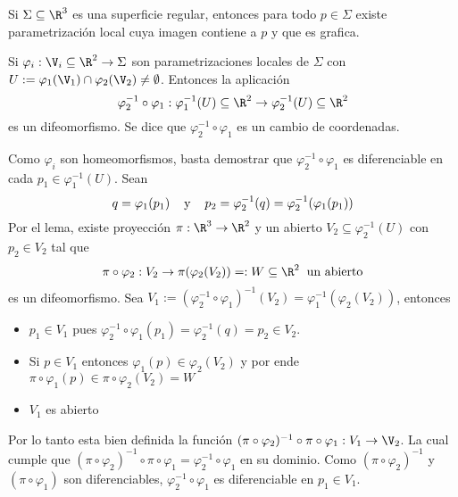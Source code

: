 \documentclass{article}
\begin{document}
\begin{cor}
    Si $\Sigma\subseteq\R^{3}$ es una superficie regular, entonces para todo $p\in\Sigma$ existe 
    parametrización local cuya imagen contiene a $p$ y que es grafica.
\end{cor}

\begin{teo}
    Si $\varphi_{i}:\V_{i}\subseteq\R^{2}\to\Sigma$ son parametrizaciones locales de $\Sigma$ con
    $U:=\varphi_{1}(\V_{1})\cap \varphi_{2}(\V_{2})\neq\emptyset$. Entonces la aplicación
    \begin{equation*}
        \varphi_{2}^{-1}\circ \varphi_{1}:\varphi_{1}^{-1}(U)\subseteq\R^{2}\to 
        \varphi_{2}^{-1}(U)\subseteq\R^{2}
    \end{equation*}
    es un difeomorfismo. Se dice que $\varphi_{2}^{-1}\circ \varphi_{1}$ es un cambio de 
    coordenadas.
\end{teo}

\begin{dem}
    Como $\varphi_{i}$ son homeomorfismos, basta demostrar que $\varphi_{2}^{-1}\circ \varphi_{1}$ 
    es diferenciable en cada $p_{1}\in \varphi_{1}^{-1}(U)$. Sean
    \begin{equation*}
        q=\varphi_{1}(p_{1})\hspace{4mm}\text{y}\hspace{4mm}p_{2}=\varphi_{2}^{-1}(q)=\varphi_{2}^{-1}(\varphi_{1}(p_{1}))
    \end{equation*}
    Por el lema, existe proyección $\pi:\R^{3}\to\R^{2}$ y un abierto $V_{2}\subseteq 
    \varphi_{2}^{-1}(U)$ con $p_{2}\in V_{2}$ tal que
    \begin{equation*}
        \pi\circ \varphi_{2}:V_{2}\to\pi(\varphi_{2}(V_{2}))=:W\subseteq\R^{2}\hspace{2mm}
        \text{un abierto}
    \end{equation*}
    es un difeomorfismo. Sea $V_{1}:=(\varphi_{2}^{-1}\circ \varphi_{1})^{-1}(V_{2})=
    \varphi_{1}^{-1}(\varphi_{2}(V_{2}))$, entonces
    \begin{itemize}
        \item $p_{1}\in V_{1}$ pues $\varphi_{2}^{-1}\circ \varphi_{1}(p_{1})=\varphi_{2}^{-1}(q)
        =p_{2}\in V_{2}$.
        
        \item Si $p\in V_{1}$ entonces $\varphi_{1}(p)\in\varphi_{2}(V_{2})$ y por ende
        $\pi\circ\varphi_{1}(p)\in\pi\circ\varphi_{2}(V_{2})=W$
        
        \item $V_{1}$ es abierto
    \end{itemize}
    Por lo tanto esta bien definida la función $(\pi\circ\varphi_{2})^{-1}\circ\pi\circ\varphi_{1}:
    V_{1}\to\V_{2}$. La cual cumple que $(\pi\circ\varphi_{2})^{-1}\circ\pi\circ\varphi_{1}=
    \varphi_{2}^{-1}\circ\varphi_{1}$ en su dominio. Como $(\pi\circ\varphi_{2})^{-1}$ y
    $(\pi\circ\varphi_{1})$ son diferenciables, $\varphi_{2}^{-1}\circ\varphi_{1}$ es diferenciable 
    en $p_{1}\in V_{1}$.
\end{dem}
\end{document}
